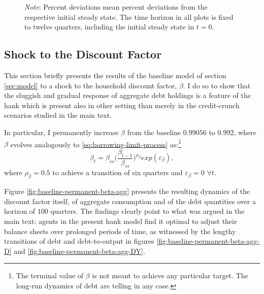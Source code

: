 \documentclass[a4paper,12pt]{article} %
\numberwithin{equation}{section} %
\numberwithin{figure}{section}
\numberwithin{table}{section}
\begin{document}
\begin{refsection}
\begin{appendices}
\begin{figure}[H]
     \vspace{10pt}
     
     \justifying
     \footnotesize
	\textit{Note}: Percent deviations mean percent deviations from the respective initial steady state. The time horizon in all plots is fixed to twelve quarters, including the initial steady state in $t=0$.
\end{figure}

\subsection{Shock to the Discount Factor}
\label{sec-app:robust-beta}

This section briefly presents the results of the baseline model of section \ref{sec:model} to a shock to the household discount factor, $\beta$. I do so to show that the sluggish and gradual response of aggregate debt holdings is a feature of the \Gls{hank} which is present also in other setting than merely in the credit-crunch scenarios studied in the main text.

In particular, I permanently increase $\beta$ from the baseline $0.99056$ to $0.992$, where $\beta$ evolves analogously to \eqref{eq:borrowing-limit-process} as:\footnote{The terminal value of $\beta$ is not meant to achieve any particular target. The long-run dynamics of debt are telling in any case.}
\begin{equation*}
    \beta_t = \beta_{ss} \Bigg( \frac{\beta_{t-1}}{\beta_{ss}} \Bigg)^{\rho_{\beta}} exp(\varepsilon_{\beta}),
\end{equation*}
where $\rho_{\beta} = 0.5$ to achieve a transition of six quarters and $\varepsilon_{\beta} = 0$ $\forall t$.

Figure \ref{fig:baseline-permanent-beta-agg} presents the resulting dynamics of the discount factor itself, of aggregate consumption and of the debt quantities over a horizon of $100$ quarters. The findings clearly point to what was argued in the main text: agents in the present \Gls{hank} model find it optimal to adjust their balance sheets over prolonged periods of time, as witnessed by the lengthy transitions of debt and debt-to-output in figures \ref{fig:baseline-permanent-beta-agg-D} and \ref{fig:baseline-permanent-beta-agg-DY}.


\end{appendices}
\end{refsection}
\end{document}

